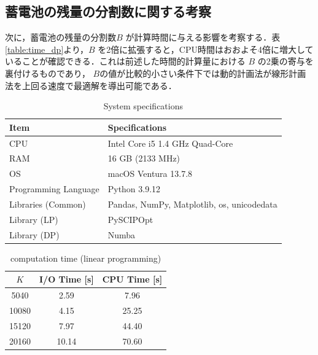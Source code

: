 \subsection{蓄電池の残量の分割数に関する考察}
次に，蓄電池の残量の分割数$B$ が計算時間に与える影響を考察する．表\ref{table:time_dp}より，$B$ を2倍に拡張すると，CPU時間はおおよそ4倍に増大していることが確認できる．これは前述した時間的計算量における $B$ の2乗の寄与を裏付けるものであり，
$B$の値が比較的小さい条件下では動的計画法が線形計画法を上回る速度で最適解を導出可能である．
\begin{table}[htbp]
  \centering
  \caption{System specifications}
  \label{table:environment}
  \begin{tabular}{ll}
    \hline
    Item & Specifications \\
    \hline \hline
    CPU & Intel Core i5 1.4 GHz Quad-Core \\
    RAM & 16 GB (2133 MHz) \\
    OS & macOS Ventura 13.7.8 \\
    Programming Language & Python 3.9.12 \\
    Libraries (Common) & Pandas, NumPy, Matplotlib, os, unicodedata \\ 
    Library (LP) & PySCIPOpt \\
    Library (DP) & Numba \\
    \hline
  \end{tabular}
\end{table}

\begin{table}[htbp]
  \centering
  \caption{computation time (linear programming)}
  \label{table:time_lp}
  \begin{tabular}{ccc}
    \hline
    $K$ & I/O Time [s] & CPU Time [s] \\ 
    \hline \hline
    5040  & 2.59  & 7.96  \\
    10080 & 4.15  & 25.25 \\
    15120 & 7.97  & 44.40 \\
    20160 & 10.14 & 70.60 \\
    \hline
  \end{tabular}
\end{table}

